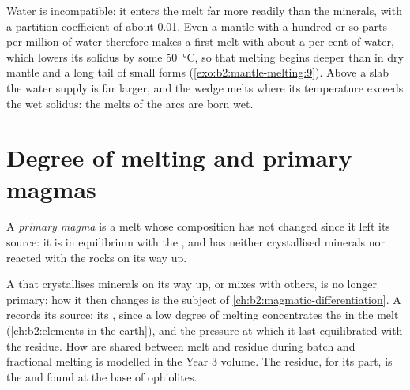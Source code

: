 Water is incompatible: it enters the melt far more readily than the minerals,
with a partition coefficient of about 0.01. Even a mantle with a hundred or so
parts per million of water therefore makes a first melt with about a per cent of
water, which lowers its solidus by some \qty{50}{\celsius}, so that melting
begins deeper than in dry mantle and a long tail of small  forms
(\cref{exo:b2:mantle-melting:9}). Above a slab the water supply is far larger, and the wedge melts
where its temperature exceeds the wet solidus: the melts of the arcs are born
wet.

\section{Degree of melting and primary magmas}\label{sec:b2:mantle-melting:primary}

\begin{definition}\label{def:b2:mantle-melting:primary}
A \emph{primary magma} is a melt whose composition has not
changed since it left its source: it is in equilibrium with the ,
and has neither crystallised minerals nor reacted with the rocks on its way up.
\end{definition}

A  that crystallises minerals on its way up, or mixes with others, is no
longer primary; how it then changes is the subject of
\cref{ch:b2:magmatic-differentiation}. A  records its source: its
, since a low degree of melting concentrates the 
in the melt (\cref{ch:b2:elements-in-the-earth}), and the pressure at which it last
equilibrated with the residue. How  are shared between melt and
residue during batch and fractional melting is modelled in the Year 3 volume. The
residue, for its part, is the  and  found at the base of
ophiolites.

